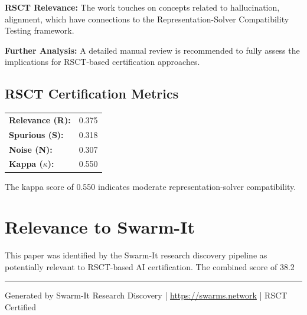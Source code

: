 \documentclass[11pt,a4paper]{article}
\begin{document}
\textbf{RSCT Relevance:} The work touches on concepts related to hallucination, alignment, which have connections to the Representation-Solver Compatibility Testing framework.

\textbf{Further Analysis:} A detailed manual review is recommended to fully assess the implications for RSCT-based certification approaches.


\subsection*{RSCT Certification Metrics}
\begin{tabular}{ll}
\textbf{Relevance (R):} & 0.375 \\
\textbf{Spurious (S):} & 0.318 \\
\textbf{Noise (N):} & 0.307 \\
\textbf{Kappa ($\kappa$):} & 0.550 \\
\end{tabular}

The kappa score of 0.550 indicates moderate representation-solver compatibility.


\section{Relevance to Swarm-It}
This paper was identified by the Swarm-It research discovery pipeline as potentially relevant to RSCT-based AI certification. The combined score of 38.2%

\vspace{1em}
\hrule
\vspace{0.5em}
\small{Generated by Swarm-It Research Discovery | \url{https://swarms.network} | RSCT Certified}
\end{document}
